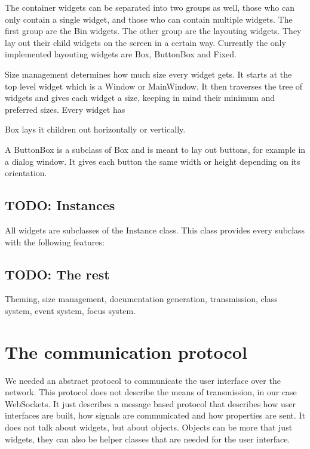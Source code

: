 \documentclass[11pt,a4paper]{article}
\begin{document}


The container widgets can be separated into two groups as well, those who can only contain a single widget, and those who can contain multiple widgets.
The first group are the Bin widgets.
The other group are the layouting widgets.
They lay out their child widgets on the screen in a certain way.
Currently the only implemented layouting widgets are Box, ButtonBox and Fixed.

Size management determines how much size every widget gets.
It starts at the top level widget which is a Window or MainWindow.
It then traverses the tree of widgets and gives each widget a size, keeping in mind their minimum and preferred sizes.
Every widget has 

Box lays it children out horizontally or vertically.


A ButtonBox is a subclass of Box and is meant to lay out buttons, for example in a dialog window.
It gives each button the same width or height depending on its orientation.








\subsection{TODO: Instances}

All widgets are subclasses of the Instance class.
This class provides every subclass with the following features:


\subsection{TODO: The rest}

Theming, size management, documentation generation, transmission, class system, event system, focus system.







\newpage
\section{The communication protocol}

We needed an abstract protocol to communicate the user interface over the network.
This protocol does not describe the means of transmission, in our case WebSockets.
It just describes a message based protocol that describes how user interfaces are built, how signals are communicated and how properties are sent.
It does not talk about widgets, but about objects. Objects can be more that just widgets, they can also be helper classes that are needed for the user interface.
\end{document}
